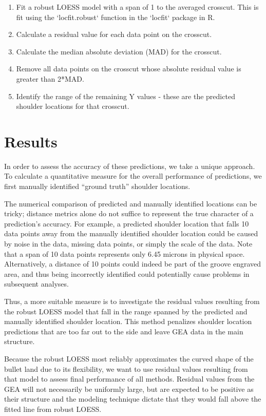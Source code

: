 \documentclass[]{article}
\begin{document}
\begin{enumerate}
\item Fit a robust LOESS model with a span of 1 to the averaged crosscut. This is fit using the `locfit.robust` function in the `locfit` package in R.
\item Calculate a residual value for each data point on the crosscut.  
\item Calculate the median absolute deviation (MAD) for the crosscut.  
\item Remove all data points on the crosscut whose absolute residual value is greater than 2*MAD.  
\item Identify the range of the remaining Y values - these are the predicted shoulder locations for that crosscut.   
\end{enumerate}

\section{Results}

In order to assess the accuracy of these predictions, we take a unique
approach. To calculate a quantitative measure for the overall
performance of predictions, we first manually identified ``ground
truth'' shoulder locations.

The numerical comparison of predicted and manually identified locations
can be tricky; distance metrics alone do not suffice to represent the
true character of a prediction's accuracy. For example, a predicted
shoulder location that falls 10 data points away from the manually
identified shoulder location could be caused by noise in the data,
missing data points, or simply the scale of the data. Note that a span
of 10 data points represents only 6.45 microns in physical space.
Alternatively, a distance of 10 points could indeed be part of the
groove engraved area, and thus being incorrectly identified could
potentially cause problems in subsequent analyses.

Thus, a more suitable measure is to investigate the residual values
resulting from the robust LOESS model that fall in the range spanned by
the predicted and manually identified shoulder location. This method
penalizes shoulder location predictions that are too far out to the side
and leave GEA data in the main structure.

Because the robust LOESS most reliably approximates the curved shape of
the bullet land due to its flexibility, we want to use residual values
resulting from that model to assess final performance of all methods.
Residual values from the GEA will not necessarily be uniformly large,
but are expected to be positive as their structure and the modeling
technique dictate that they would fall above the fitted line from robust
LOESS.
\end{document}
